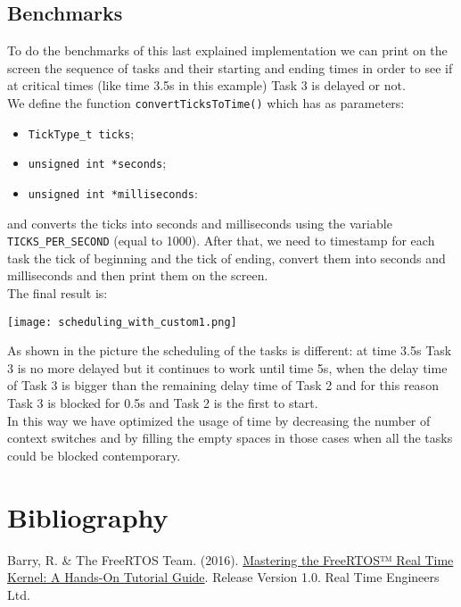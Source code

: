 \documentclass[a4paper,11pt]{report}
\begin{document}
\subsection{Benchmarks}
To do the benchmarks of this last explained implementation we can print on the screen the sequence of tasks and their starting and ending times in order to see if at critical times (like time 3.5s in this example) Task 3 is delayed or not.\\
We define the function \texttt{convertTicksToTime()} which has as parameters:
\begin{itemize}
    \item \texttt{TickType\_t ticks};
    \item \texttt{unsigned int *seconds};
    \item \texttt{unsigned int *milliseconds}:
\end{itemize}
and converts the ticks into seconds and milliseconds using the variable \texttt{TICKS\_PER\_SECOND} (equal to 1000).
After that, we need to timestamp for each task the tick of beginning and the tick of ending, convert them into seconds and milliseconds and then print them on the screen.\\
The final result is:
\begin{center}
  \texttt{[image: scheduling\_with\_custom1.png]}
\end{center}
As shown in the picture the scheduling of the tasks is different: at time 3.5s Task 3 is no more delayed but it continues to work until time 5s, when the delay time of Task 3 is bigger than the remaining delay time of Task 2 and for this reason Task 3 is blocked for 0.5s and Task 2 is the first to start.\\
In this way we have optimized the usage of time by decreasing the number of context switches and by filling the empty spaces in those cases when all the tasks could be blocked contemporary.\\


\newpage 
\section{Bibliography}

\vspace{3ex}

Barry, R. \& The FreeRTOS Team. (2016). \href{https://www.freertos.org/Documentation/Mastering-the-FreeRTOS-Real-Time-Kernel.v1.0.pdf}{Mastering the FreeRTOS™ Real Time Kernel: A Hands-On Tutorial Guide}. Release Version 1.0. Real Time Engineers Ltd.\\
\end{document}

